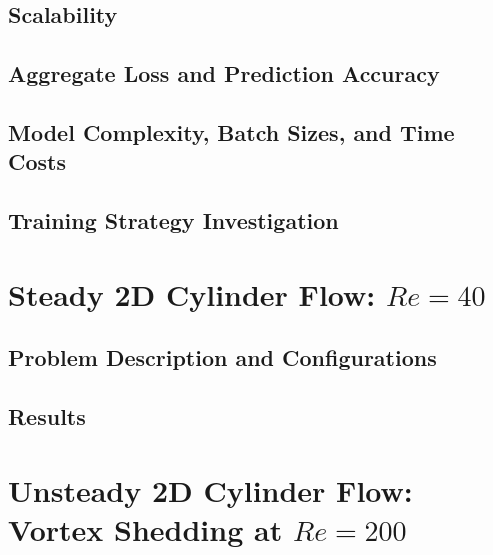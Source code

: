 \documentclass[font=STIX2]{gw-dissertation}[2021/11/19]
\begin{document}
        \subsection{Scalability}
        \label{sec:pinn-2d-tgv-scaling}
        

        \subsection{Aggregate Loss and Prediction Accuracy}
        \label{sec:pinn-2d-tgv-loss-vs-accuracy}
        

        \subsection{Model Complexity, Batch Sizes, and Time Costs}
        \label{sec:pinn-2d-tgv-model-complexity}
        

        \subsection{Training Strategy Investigation}
        \label{sec:pinn-2d-tgv-training-strategy}
        

    \section{Steady 2D Cylinder Flow: \texorpdfstring{$Re=40$}{re40}}
    \label{sec:pinn-2d-cylinder-re40}

        \subsection{Problem Description and Configurations}
        \label{sec:pinn-2d-cylinder-re40-conf}
        

        \subsection{Results}
        \label{sec:pinn-2d-cylinder-re40-results}
        

    \section{Unsteady 2D Cylinder Flow: Vortex Shedding at \texorpdfstring{$Re=200$}{re200}}
    \label{sec:pinn-2d-cylinder-re200}
\end{document}
